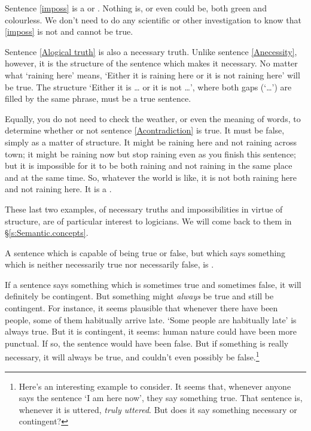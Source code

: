 Sentence \ref{imposs} is a  or . Nothing is, or even could be, both green and colourless. We don't need to do any scientific or other investigation to know that \ref{imposs} is not and cannot be true.

Sentence \ref{Alogical truth} is also a necessary truth. Unlike sentence \ref{Anecessity}, however, it is the structure of the sentence which makes it necessary. No matter what `raining here' means, `Either it is raining here or it is not raining here' will be true. The structure `\textsf{Either it is} … \textsf{or it is not} …', where both gaps (`…') are filled by the same phrase, must be a true sentence.

Equally, you do not need to check the weather, or even the meaning of words, to determine whether or not sentence \ref{Acontradiction} is true. It must be false, simply as a matter of structure. It might be raining here and not raining across town; it might be raining now but stop raining even as you finish this sentence; but it is impossible for it to be both raining and not raining in the same place and at the same time. So, whatever the world is like, it is not both raining here and not raining here. It is a .

These last two examples, of necessary truths and impossibilities in virtue of structure, are of particular interest to logicians. We will come back to them in §\ref{s:Semantic.concepts}.

A sentence which is capable of being true or false, but which says something which is neither necessarily true nor necessarily false, is .

If a sentence says something which is sometimes true and sometimes false, it will definitely be contingent. But something might \emph{always} be true and still be contingent. For instance, it seems plausible that whenever there have been people, some of them habitually arrive late. `Some people are habitually late' is always true. But it is contingent, it seems: human nature could have been more punctual. If so, the sentence would have been false. But if something is really necessary, it will always be true, and couldn't even possibly be false.\footnote{Here's an interesting example to consider. It seems that, whenever anyone says the sentence `I am here now', they say something true. That sentence is, whenever it is uttered, \emph{truly uttered}. But does it say something necessary or contingent?}


